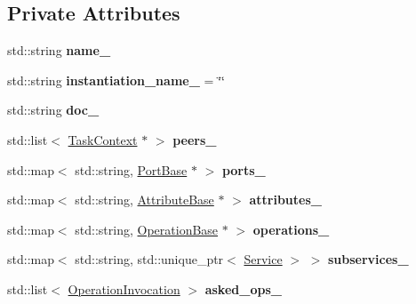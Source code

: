 \subsection*{Private Attributes}
\begin{DoxyCompactItemize}
\item 
\hypertarget{classcoco_1_1_service_ab7810b45fabd24c1283e094b8cddb0a9}{}std\+::string {\bfseries name\+\_\+}\label{classcoco_1_1_service_ab7810b45fabd24c1283e094b8cddb0a9}

\item 
\hypertarget{classcoco_1_1_service_a23cecfceac026295736fb1e86177346b}{}std\+::string {\bfseries instantiation\+\_\+name\+\_\+} = \char`\"{}\char`\"{}\label{classcoco_1_1_service_a23cecfceac026295736fb1e86177346b}

\item 
\hypertarget{classcoco_1_1_service_a18ce98161d3f88d130bab79a7219b202}{}std\+::string {\bfseries doc\+\_\+}\label{classcoco_1_1_service_a18ce98161d3f88d130bab79a7219b202}

\item 
\hypertarget{classcoco_1_1_service_a3a496756e69bdf85ead40b87ba4af448}{}std\+::list$<$ \hyperlink{classcoco_1_1_task_context}{Task\+Context} $\ast$ $>$ {\bfseries peers\+\_\+}\label{classcoco_1_1_service_a3a496756e69bdf85ead40b87ba4af448}

\item 
\hypertarget{classcoco_1_1_service_a548c23cff551beb95fd53232e8f2bc33}{}std\+::map$<$ std\+::string, \hyperlink{classcoco_1_1_port_base}{Port\+Base} $\ast$ $>$ {\bfseries ports\+\_\+}\label{classcoco_1_1_service_a548c23cff551beb95fd53232e8f2bc33}

\item 
\hypertarget{classcoco_1_1_service_ab2dde04a643254e7d7cf0f08368d2b8c}{}std\+::map$<$ std\+::string, \hyperlink{classcoco_1_1_attribute_base}{Attribute\+Base} $\ast$ $>$ {\bfseries attributes\+\_\+}\label{classcoco_1_1_service_ab2dde04a643254e7d7cf0f08368d2b8c}

\item 
\hypertarget{classcoco_1_1_service_a02f04c8c548979377ab3534347da00c0}{}std\+::map$<$ std\+::string, \hyperlink{classcoco_1_1_operation_base}{Operation\+Base} $\ast$ $>$ {\bfseries operations\+\_\+}\label{classcoco_1_1_service_a02f04c8c548979377ab3534347da00c0}

\item 
\hypertarget{classcoco_1_1_service_ac91c9c92152cff27cb5c72a7c402a37b}{}std\+::map$<$ std\+::string, std\+::unique\+\_\+ptr$<$ \hyperlink{classcoco_1_1_service}{Service} $>$ $>$ {\bfseries subservices\+\_\+}\label{classcoco_1_1_service_ac91c9c92152cff27cb5c72a7c402a37b}

\item 
\hypertarget{classcoco_1_1_service_a35020cbe1d435a6b901b28ebf1599cff}{}std\+::list$<$ \hyperlink{structcoco_1_1_operation_invocation}{Operation\+Invocation} $>$ {\bfseries asked\+\_\+ops\+\_\+}\label{classcoco_1_1_service_a35020cbe1d435a6b901b28ebf1599cff}

\end{DoxyCompactItemize}
